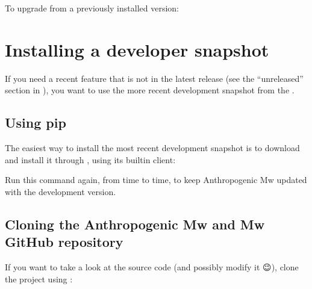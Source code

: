 \documentclass[letterpaper,10pt,english]{sphinxmanual}
\begin{document}
\sphinxAtStartPar
To upgrade from a previously installed version:

\begin{sphinxVerbatim}[commandchars=\\\{\}]
   
\end{sphinxVerbatim}


\section{Installing a developer snapshot}
\label{\detokenize{installation:installing-a-developer-snapshot}}
\sphinxAtStartPar
If you need a recent feature that is not in the latest release (see the
“unreleased” section in {\hyperref[\detokenize{changelog:changelog}]{}}),
you want to use the more recent development snapshot from the .


\subsection{Using pip}
\label{\detokenize{installation:using-pip}}
\sphinxAtStartPar
The easiest way to install the most recent development snapshot is to download
and install it through , using its builtin  client:

\begin{sphinxVerbatim}[commandchars=\\\{\}]
  
\end{sphinxVerbatim}

\sphinxAtStartPar
Run this command again, from time to time, to keep Anthropogenic Mw updated with
the development version.


\subsection{Cloning the Anthropogenic Mw and Mw GitHub repository}
\label{\detokenize{installation:cloning-the-anthropogenic-mw-and-mw-github-repository}}
\sphinxAtStartPar
If you want to take a look at the source code (and possibly modify it 😉),
clone the project using :
\end{document}

